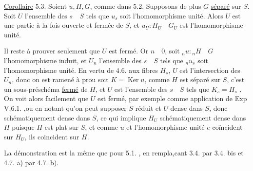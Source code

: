

\uline{Corollaire} 5.3. \quad Soient $u,H,G$, comme dans 5.2. Supposons de plus $G$ \uline{séparé} sur $S$. Soit $U$ l'ensemble des $s\quad S$ tels que $u_s$ soit l'homomorphisme unité. Alors $U$ est une partie à la fois ouverte et fermée de $S$, et $u_U:H_U\quad G_U$ est l'homomorphisme unité.

Il reste à prouver seulement que $U$ est fermé. Or  $n\quad 0$, soit $ {}_nu:{}_nH\quad G$ l'homomorphisme induit, et $U_n$ l'ensemble des $s\quad S$ tels que $ {}_nu_s$ soit l'homomorphisme unité. En vertu de 4.6.  aux fibres $H_s$, $U$ est l'intersection des $U_n$, donc on est ramené à prou soit $K=\operatorname{Ker}u$, comme $H$ est séparé sur $S$, c'est un sous-préschéma \uline{fermé} de $H$, et $U$ est l'ensemble des $s\quad S$ tels que $K_s=$$H_s$ . On voit alors  facilement que $U$ est fermé, par exemple comme application de Exp V,6.1. ,ou en  notant qu'on peut supposer $S$ réduit et $U$ dense dans $S$, donc schématiquement dense dans $S$, ce qui implique $H_U$ schématiquement dense dans $H$ puisque $H$ est plat sur $S$, et comme $u$ et l'homomorphisme unité $e$ coïncident sur $H_U$, ils coincident sur $H$.

La démonstration est la même que pour 5.1. , en rempla,cant 3.4. par 3.4. bis et 4.7. a) par 4.7. b).


